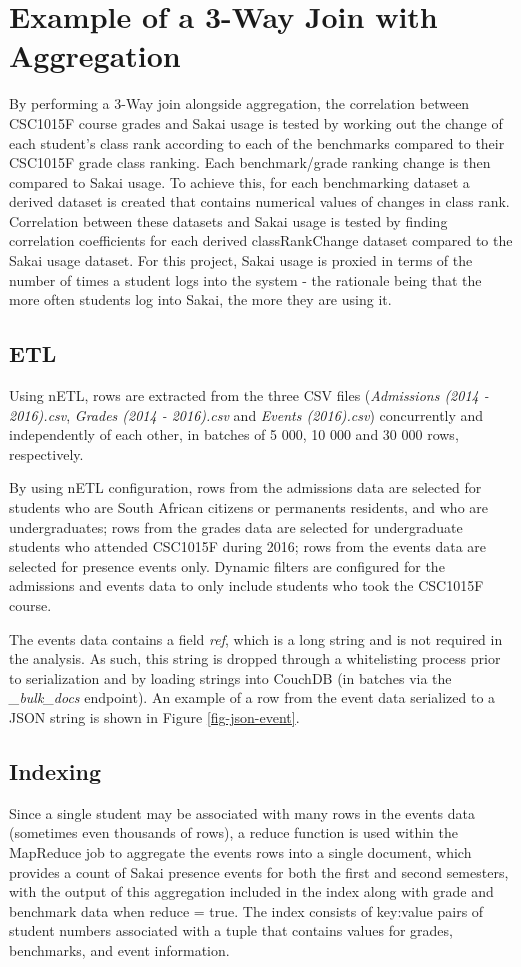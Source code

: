 \section{Example of a 3-Way Join with Aggregation}
By performing a 3-Way join alongside aggregation, the correlation between CSC1015F course grades and Sakai usage is tested by working out the change of each student's class rank according to each of the benchmarks compared to their CSC1015F grade class ranking. Each benchmark/grade ranking change is then compared to Sakai usage. To achieve this, for each benchmarking dataset a derived dataset is created that contains numerical values of changes in class rank. Correlation between these datasets and Sakai usage is tested by finding correlation coefficients for each derived classRankChange dataset compared to the Sakai usage dataset. For this project, Sakai usage is proxied in terms of the number of times a student logs into the system - the rationale being that the more often students log into Sakai, the more they are using it.

\subsection{ETL}
Using nETL, rows are extracted from the three CSV files (\textit{Admissions (2014 - 2016).csv}, \textit{Grades (2014 - 2016).csv} and \textit{Events (2016).csv}) concurrently and independently of each other, in batches of 5 000, 10 000 and 30 000 rows, respectively.

By using nETL configuration, rows from the admissions data are selected for students who are South African citizens or permanents residents, and who are undergraduates; rows from the grades data are selected for undergraduate students who attended CSC1015F during 2016; rows from the events data are selected for presence events only. Dynamic filters are configured for the admissions and events data to only include students who took the CSC1015F course.

The events data contains a field \textit{ref}, which is a long string and is not required in the analysis. As such, this string is dropped through a whitelisting process prior to serialization and by loading strings into CouchDB (in batches via the \textit{\_bulk\_docs} endpoint). An example of a row from the event data serialized to a JSON string is shown in Figure \ref{fig-json-event}.



\subsection{Indexing}
Since a single student may be associated with many rows in the events data (sometimes even thousands of rows), a reduce function is used within the MapReduce job to aggregate the events rows into a single document, which provides a count of Sakai presence events for both the first and second semesters, with the output of this aggregation included in the index along with grade and benchmark data when reduce = true. The index consists of key:value pairs of student numbers associated with a tuple that contains values for grades, benchmarks, and event information.

